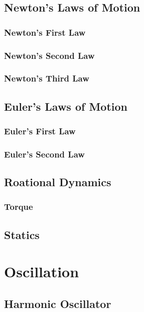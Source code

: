 	\subsection{Newton's Laws of Motion}
		\subsubsection{Newton's First Law}
		\subsubsection{Newton's Second Law}
		\subsubsection{Newton's Third Law}
	\subsection{Euler's Laws of Motion}
		\subsubsection{Euler's First Law}
		\subsubsection{Euler's Second Law}	
	\subsection{Roational Dynamics}
		\subsubsection{Torque}
	\subsection{Statics}

\section{Oscillation}
	\subsection{Harmonic Oscillator}